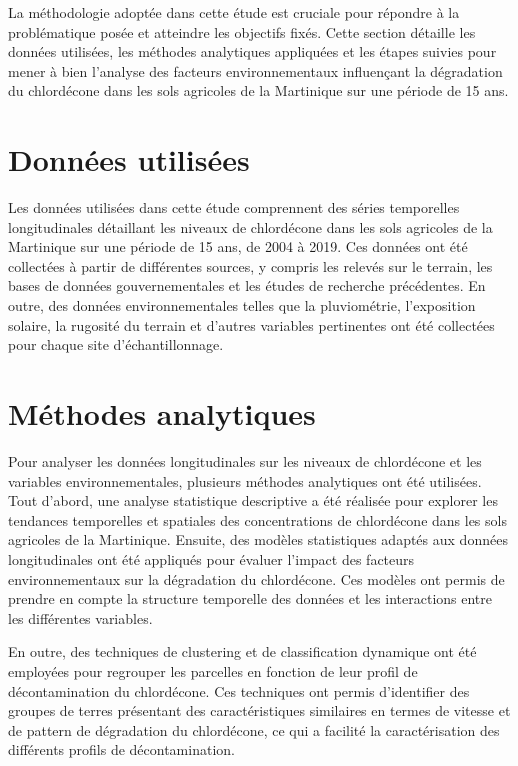 \documentclass{report}
\begin{document}
La méthodologie adoptée dans cette étude est cruciale pour répondre à la problématique posée et atteindre les objectifs fixés. Cette section détaille les données utilisées, les méthodes analytiques appliquées et les étapes suivies pour mener à bien l'analyse des facteurs environnementaux influençant la dégradation du chlordécone dans les sols agricoles de la Martinique sur une période de 15 ans.

\section{Données utilisées}

Les données utilisées dans cette étude comprennent des séries temporelles longitudinales détaillant les niveaux de chlordécone dans les sols agricoles de la Martinique sur une période de 15 ans, de 2004 à 2019. Ces données ont été collectées à partir de différentes sources, y compris les relevés sur le terrain, les bases de données gouvernementales et les études de recherche précédentes. En outre, des données environnementales telles que la pluviométrie, l'exposition solaire, la rugosité du terrain et d'autres variables pertinentes ont été collectées pour chaque site d'échantillonnage.

\section{Méthodes analytiques}

Pour analyser les données longitudinales sur les niveaux de chlordécone et les variables environnementales, plusieurs méthodes analytiques ont été utilisées. Tout d'abord, une analyse statistique descriptive a été réalisée pour explorer les tendances temporelles et spatiales des concentrations de chlordécone dans les sols agricoles de la Martinique. Ensuite, des modèles statistiques adaptés aux données longitudinales ont été appliqués pour évaluer l'impact des facteurs environnementaux sur la dégradation du chlordécone. Ces modèles ont permis de prendre en compte la structure temporelle des données et les interactions entre les différentes variables.

En outre, des techniques de clustering et de classification dynamique ont été employées pour regrouper les parcelles en fonction de leur profil de décontamination du chlordécone. Ces techniques ont permis d'identifier des groupes de terres présentant des caractéristiques similaires en termes de vitesse et de pattern de dégradation du chlordécone, ce qui a facilité la caractérisation des différents profils de décontamination.
\end{document}
